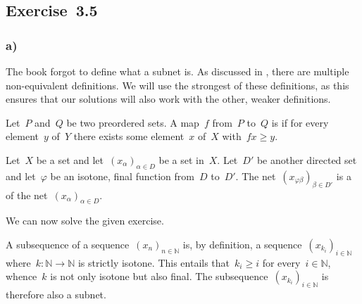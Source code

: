 \subsection{Exercise~3.5}



\subsubsection{a)}

The book forgot to define what a subnet is.
As discussed in \cite[§Subnets]{nlab_subnets}, there are multiple non-equivalent definitions.
We will use the strongest of these definitions, as this ensures that our solutions will also work with the other, weaker definitions.

\begin{definition}
	Let~$P$ and~$Q$ be two preordered sets.
	A map~$f$ from~$P$ to~$Q$ is  if for every element~$y$ of~$Y$ there exists some element~$x$ of~$X$ with~$f x ≥ y$.
\end{definition}

\begin{definition}
	\label{definition of subnet}
	Let~$X$ be a set and let~$(x_α)_{α ∈ D}$ be a set in~$X$.
	Let~$D'$ be another directed set and let~$φ$ be an isotone, final function from~$D$ to~$D'$.
	The net~$(x_{φ β})_{β ∈ D'}$ is a  of the net~$(x_α)_{α ∈ D}$.
\end{definition}

We can now solve the given exercise.

A subsequence of a sequence~$(x_n)_{n ∈ ℕ}$ is, by definition, a sequence~$(x_{k_i})_{i ∈ ℕ}$ where~$k \colon ℕ \to ℕ$ is strictly isotone.
This entails that~$k_i ≥ i$ for every~$i ∈ ℕ$, whence~$k$ is not only isotone but also final.
The subsequence~$(x_{k_i})_{i ∈ ℕ}$ is therefore also a subnet.

